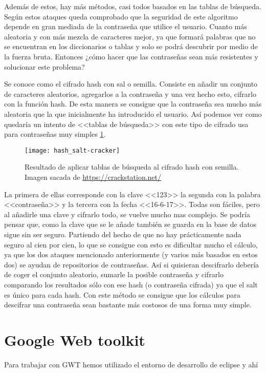 Además de estos, hay más métodos, casi todos basados en las tablas de búsqueda. Según estos ataques queda comprobado que la seguridad de este algoritmo depende en gran mediada de la contraseña que utilice el usuario. Cuanto más aleatoria y con más mezcla de caracteres mejor, ya que formará palabras que no se encuentran en los diccionarios o tablas y solo se podrá descubrir por medio de la fuerza bruta. Entonces ¿cómo hacer que las contraseñas sean más resistentes y solucionar este problema?

Se conoce como el cifrado hash con sal o semilla. Consiste en añadir un conjunto de caracteres aleatorios, agregarlos a la contraseña y una vez hecho esto, cifrarlo con la función hash. De esta manera se consigue que la contraseña sea mucho más aleatoria que la que inicialmente ha introducido el usuario. Así podemos ver como quedaría un intento de <<tablas de búsqueda>> con este tipo de cifrado usa para contraseñas muy simples \ref{fig:3.3}. 

\begin{figure}[h]
\centering
\texttt{[image: hash\_salt-cracker]}
\caption{Resultado de aplicar tablas de búsqueda al cifrado hash con semilla. Imagen sacada de \url{https://crackstation.net/}}
\label{fig:3.3}
\end{figure}

La primera de ellas corresponde con la clave <<123>> la segunda con la palabra <<contraseña>> y la tercera con la fecha <<16-6-17>>. Todas son fáciles, pero al añadirle una clave y cifrarlo todo, se vuelve mucho mas complejo. Se podría pensar que, como la clave que se le añade también se guarda en la base de datos sigue sin ser seguro. Partiendo del hecho de que no hay prácticamente nada seguro al cien por cien, lo que se consigue con esto es dificultar mucho el cálculo, ya que los dos ataques mencionado anteriormente (y varios más basados en estos dos) se ayudan de repositorios de contraseñas. Así si quisieran descifrarlo debería de coger el conjunto aleatorio, sumarle la posible contraseña y cifrarlo comparando los resultados sólo con ese hash (o contraseña cifrada) ya que el salt es único para cada hash. Con este método se consigue que los cálculos para descifrar una contraseña sean bastante más costosos de una forma muy simple.

\section{Google Web toolkit}
Para trabajar con GWT hemos utilizado el entorno de desarrollo de eclipse y ahí 
 
